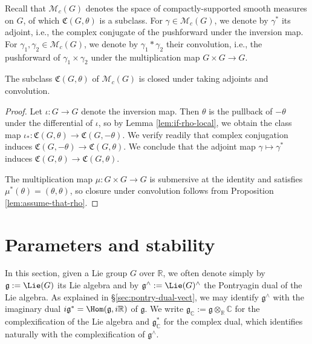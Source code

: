 Recall that $\mathcal{M}_c(G)$ denotes the space of compactly-supported smooth measures on $G$, of which $\mathfrak{C}(G,\theta)$ is a subclass.  For $\gamma \in \mathcal{M}_c(G)$, we denote by $\gamma^*$ its adjoint, i.e., the complex conjugate of the pushforward under the inversion map.  For $\gamma_1, \gamma_2 \in \mathcal{M}_c(G)$, we denote by $\gamma_1 \ast \gamma_2$ their convolution, i.e., the pushforward of $\gamma_1 \times \gamma_2$ under the multiplication map $G \times G \rightarrow G$.
\begin{proposition}\label{lem:standard:subcl-mathfr-theta}
  The subclass $\mathfrak{C}(G,\theta)$ of $\mathcal{M}_c(G)$ is closed under taking adjoints and convolution.
\end{proposition}
\begin{proof}
  Let $\iota : G \rightarrow G$ denote the inversion map.  Then $\theta$ is the pullback of $- \theta$ under the differential of $\iota$, so by Lemma \ref{lem:if-rho-local}, we obtain the class map $\iota_* : \mathfrak{C}(G,\theta) \rightarrow \mathfrak{C}(G,-\theta)$.  We verify readily that complex conjugation induces $\mathfrak{C}(G,-\theta) \rightarrow \mathfrak{C}(G,\theta)$.  We conclude that the adjoint map $\gamma \mapsto \gamma^*$ induces $\mathfrak{C}(G,\theta) \rightarrow \mathfrak{C}(G,\theta)$.

  The multiplication map $\mu : G \times G \rightarrow G$ is submersive at the identity and satisfies $\mu^*(\theta) = (\theta,\theta)$, so closure under convolution follows from Proposition \ref{lem:assume-that-rho}.
\end{proof}



\section{Parameters and stability}\label{sec:parameters-stability}
In this section, given a Lie group $G$ over $\mathbb{R}$, we often denote simply by $\mathfrak{g} := \Lie(G)$ its Lie algebra and by $\mathfrak{g}^\wedge := \Lie(G)^\wedge$ the Pontryagin dual of the Lie algebra.  As explained in \S\ref{sec:pontry-dual-vect}, we may identify $\mathfrak{g}^\wedge$ with the imaginary dual $i \mathfrak{g}^* = \Hom(\mathfrak{g}, i \mathbb{R})$ of $\mathfrak{g}$.  We write $\mathfrak{g}_\mathbb{C} := \mathfrak{g}\otimes_{\mathbb{R}} \mathbb{C}$ for the complexification of the Lie algebra and $\mathfrak{g}_\mathbb{C}^*$ for the complex dual, which identifies naturally with the complexification of $\mathfrak{g}^\wedge$.

